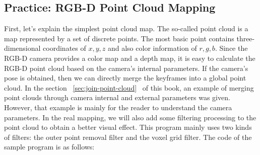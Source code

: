 \subsection{Practice: RGB-D Point Cloud Mapping}
First, let's explain the simplest point cloud map. The so-called point cloud is a map represented by a set of discrete points. The most basic point contains three-dimensional coordinates of $x, y, z$ and also color information of $r, g, b$. Since the RGB-D camera provides a color map and a depth map, it is easy to calculate the RGB-D point cloud based on the camera's internal parameters. If the camera's pose is obtained, then we can directly merge the keyframes into a global point cloud. In the section ~\ref{sec:join-point-cloud}~ of this book, an example of merging point clouds through camera internal and external parameters was given. However, that example is mainly for the reader to understand the camera parameters. In the real mapping, we will also add some filtering processing to the point cloud to obtain a better visual effect. This program mainly uses two kinds of filters: the outer point removal filter and the voxel grid filter. The code of the sample program is as follows:

